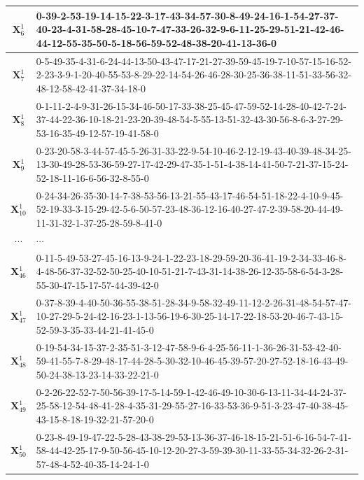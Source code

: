{{\begin{enumerate}[align = left, left = 0cm, nolistsep]
{\begin{tabularx}{\textwidth}{|c|p{11cm}|}
                  $\boldsymbol{X}_{6}^{1}$  & 0-39-2-53-19-14-15-22-3-17-43-34-57-30-8-49-24-16-1-54-27-37-40-23-4-31-58-28-45-10-7-47-33-26-32-9-6-11-25-29-51-21-42-46-44-12-55-35-50-5-18-56-59-52-48-38-20-41-13-36-0 \\ \hline
                  $\boldsymbol{X}_{7}^{1}$  & 0-5-49-35-4-31-6-24-44-13-50-43-47-17-21-27-39-59-45-19-7-10-57-15-16-52-2-23-3-9-1-20-40-55-53-8-29-22-14-54-26-46-28-30-25-36-38-11-51-33-56-32-48-12-58-42-41-37-34-18-0 \\ \hline
                  $\boldsymbol{X}_{8}^{1}$  & 0-1-11-2-4-9-31-26-15-34-46-50-17-33-38-25-45-47-59-52-14-28-40-42-7-24-37-44-22-36-10-18-21-23-20-39-48-54-5-55-13-51-32-43-30-56-8-6-3-27-29-53-16-35-49-12-57-19-41-58-0 \\ \hline
                  $\boldsymbol{X}_{9}^{1}$  & 0-23-20-58-3-44-57-45-5-26-31-33-22-9-54-10-46-2-12-19-43-40-39-48-34-25-13-30-49-28-53-36-59-27-17-42-29-47-35-1-51-4-38-14-41-50-7-21-37-15-24-52-18-11-16-6-56-32-8-55-0 \\ \hline
                  $\boldsymbol{X}_{10}^{1}$ & 0-24-34-26-35-30-14-7-38-53-56-13-21-55-43-17-46-54-51-18-22-4-10-9-45-52-19-33-3-15-29-42-5-6-50-57-23-48-36-12-16-40-27-47-2-39-58-20-44-49-11-31-32-1-37-25-28-59-8-41-0 \\ \hline
                  $\cdots$     & $\cdots$                                                                                                                                                                    \\ \hline
                  $\boldsymbol{X}_{46}^{1}$ & 0-11-5-49-53-27-45-16-13-9-24-1-22-23-18-29-59-20-36-41-19-2-34-33-46-8-4-48-56-37-32-52-50-25-40-10-51-21-7-43-31-14-38-26-12-35-58-6-54-3-28-55-30-47-15-17-57-44-39-42-0 \\ \hline
                  $\boldsymbol{X}_{47}^{1}$ & 0-37-8-39-4-40-50-36-55-38-51-28-34-9-58-32-49-11-12-2-26-31-48-54-57-47-10-27-29-5-24-42-16-23-1-13-56-19-6-30-25-14-17-22-18-53-20-46-7-43-15-52-59-3-35-33-44-21-41-45-0 \\ \hline
                  $\boldsymbol{X}_{48}^{1}$ & 0-19-54-34-15-37-2-35-51-3-12-47-58-9-6-4-25-56-11-1-36-26-31-53-42-40-59-41-55-7-8-29-48-17-44-28-5-30-32-10-46-45-39-57-20-27-52-18-16-43-49-50-24-38-13-23-14-33-22-21-0 \\ \hline
                  $\boldsymbol{X}_{49}^{1}$ & 0-2-26-22-52-7-50-56-39-17-5-14-59-1-42-46-49-10-30-6-13-11-34-44-24-37-25-58-12-54-48-41-28-4-35-31-29-55-27-16-33-53-36-9-51-3-23-47-40-38-45-43-15-8-18-19-32-21-57-20-0 \\ \hline
                  $\boldsymbol{X}_{50}^{1}$ & 0-23-8-49-19-47-22-5-28-43-38-29-53-13-36-37-46-18-15-21-51-6-16-54-7-41-58-44-42-25-17-9-50-56-45-10-12-20-27-3-59-39-30-11-33-55-34-32-26-2-31-57-48-4-52-40-35-14-24-1-0 \\ \hline
              \end{tabularx}
              }


\end{enumerate}}}
